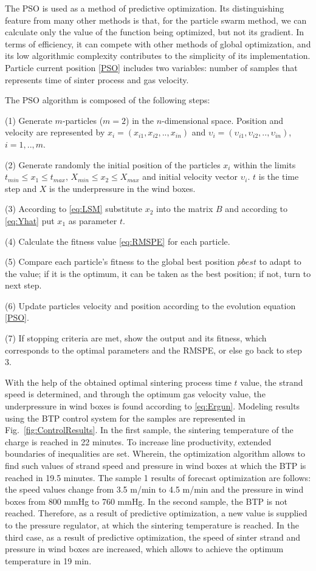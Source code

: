 \documentclass[AMS,STIX2COL]{WileyNJD-v2}
\begin{document}
The PSO is used as a method of predictive optimization. Its distinguishing feature from many other methods is that, for the particle swarm method, we can calculate only the value of the function being optimized, but not its gradient. In terms of efficiency, it can compete with other methods of global optimization, and its low algorithmic complexity contributes to the simplicity of its implementation. 
Particle current position \eqref{PSO} includes two variables: number of samples that represents time of sinter process and gas velocity.

The PSO algorithm is composed of the following steps: 

(1) Generate $m$-particles ($m=2$) in the $n$-dimensional space. Position and velocity are represented by $x_i=(x_{i1},x_{i2},..,x_{in})$ and $\upsilon_i = (\upsilon_{i1},\upsilon_{i2},..,\upsilon_{in})$, $i=1,..,m$. 

(2) Generate randomly the initial position of the particles $x_i$ within the limits $t_{min} \leqslant x_1 \leqslant t_{max}$, $X_{min} \leqslant x_2 \leqslant X_{max}$ and initial velocity vector $\upsilon_{i}$. $t$ is the time step and $X$  is the underpressure in the wind boxes. 

(3) According to \eqref{eq:LSM} substitute $x_2$ into the matrix $B$ and according to \eqref{eq:Yhat} put $x_1$ as parameter $t$. 

(4) Calculate the fitness value \eqref{eq:RMSPE} for each particle.

(5) Compare each particle’s fitness to the global best position $pbest$ to adapt to the value; if it is the optimum, it can be taken as the best position; if not, turn to next step.

(6) Update particles velocity and position according to the evolution equation \eqref{PSO}.

(7) If stopping criteria are met, show the output and its fitness, which corresponds to the optimal parameters and the RMSPE, or else go back to step 3.

With the help of the obtained optimal sintering process time $t$  value, the strand speed is determined, and through the optimum gas velocity value, the underpressure in wind boxes is found according to \eqref{eq:Ergun}. Modeling results using the BTP control system for the samples are represented in Fig.~\ref{fig:ControlResults}. In the first sample, the sintering temperature of the charge is reached in 22 minutes. To increase line productivity, extended boundaries of inequalities are set. Wherein, the optimization algorithm allows to find such values of strand speed and pressure in wind boxes at which the BTP is reached in 19.5 minutes. The sample 1 results of forecast optimization are follows: the speed values change from 3.5 m/min to 4.5 m/min and the pressure in wind boxes from 800 mmHg to 760 mmHg. In the second sample, the BTP is not reached. Therefore, as a result of predictive optimization, a new value is supplied to the pressure regulator, at which the sintering temperature is reached. In the third case, as a result of predictive optimization, the speed of sinter strand and pressure in wind boxes are increased, which allows to achieve the optimum temperature in 19 min.
\end{document}
